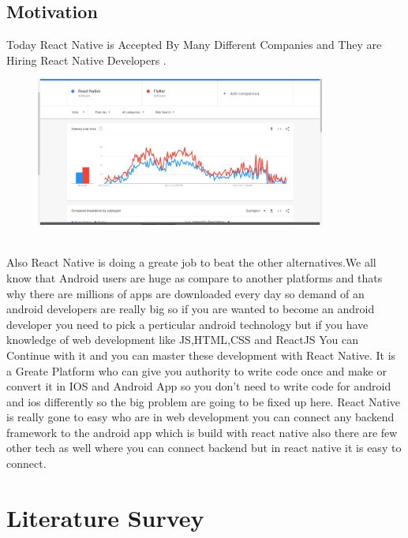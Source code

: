 \documentclass[12pt,a4paper]{report}
\begin{document}
\section{Motivation}
\hspace{0.5cm} Today React Native is Accepted By Many Different Companies and They are Hiring React Native Developers . \\
\begin{figure}[h]
    \centering
    \includegraphics[width=0.85\textwidth]{react_trends}
\end{figure}
\\
Also React Native is doing a greate job to beat the other alternatives.We all know that Android users are huge as compare to another platforms and thats why there are millions of apps are downloaded every day so demand of an android developers are really big so if you are wanted to become an android developer you need to pick a perticular android technology but if you have knowledge of web development like JS,HTML,CSS and ReactJS You can Continue with it and you can master these development with React Native. It is a Greate Platform who can give you authority to write code once and make or convert it in IOS and Android App so you don't need to write code for android and ios differently so the big problem are going to be fixed up here. React Native is really gone to easy who are in web development you can connect any backend framework to the android app which is build with react native also there are few other tech as well where you can connect backend but in react native it is easy to connect.

\newpage

\chapter{Literature Survey}
\end{document}
